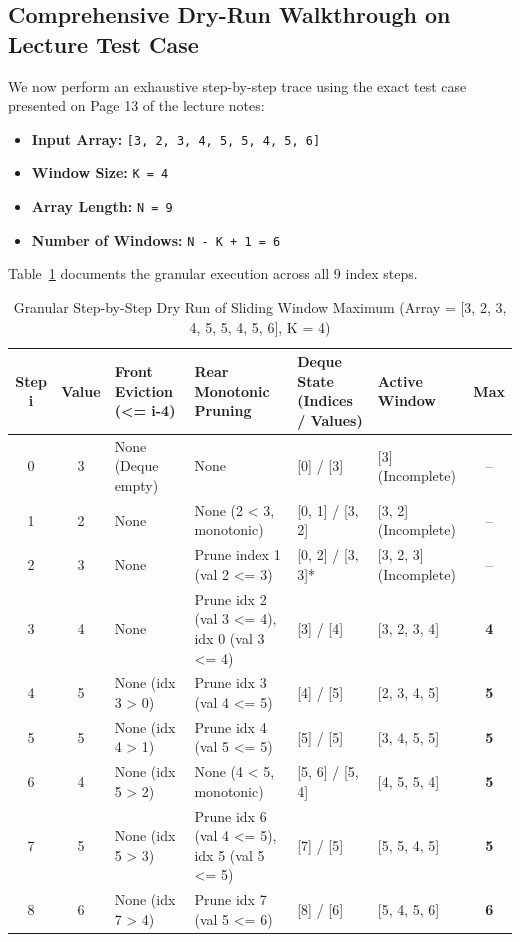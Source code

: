 \documentclass[10pt,journal,compsoc,onecolumn]{IEEEtran}
\begin{document}
\subsection{Comprehensive Dry-Run Walkthrough on Lecture Test Case}

We now perform an exhaustive step-by-step trace using the exact test case presented on Page 13 of the lecture notes:
\begin{itemize}
    \item \textbf{Input Array:} \texttt{[3, 2, 3, 4, 5, 5, 4, 5, 6]}
    \item \textbf{Window Size:} \texttt{K = 4}
    \item \textbf{Array Length:} \texttt{N = 9}
    \item \textbf{Number of Windows:} \texttt{N - K + 1 = 6}
\end{itemize}

Table~\ref{tab:sliding_window_trace} documents the granular execution across all 9 index steps.

\begin{table}[htbp]
\centering
\caption{Granular Step-by-Step Dry Run of Sliding Window Maximum (Array = [3, 2, 3, 4, 5, 5, 4, 5, 6], K = 4)}
\label{tab:sliding_window_trace}
\begin{tabular}{ccp{2.8cm}p{3.5cm}p{3.8cm}p{2.5cm}c}
\toprule
\textbf{Step i} & \textbf{Value} & \textbf{Front Eviction (<= i-4)} & \textbf{Rear Monotonic Pruning} & \textbf{Deque State (Indices / Values)} & \textbf{Active Window} & \textbf{Max} \\
\midrule
0 & 3 & None (Deque empty) & None & [0] / [3] & [3] (Incomplete) & -- \\
1 & 2 & None & None (2 < 3, monotonic) & [0, 1] / [3, 2] & [3, 2] (Incomplete) & -- \\
2 & 3 & None & Prune index 1 (val 2 <= 3) & [0, 2] / [3, 3]* & [3, 2, 3] (Incomplete) & -- \\
3 & 4 & None & Prune idx 2 (val 3 <= 4), idx 0 (val 3 <= 4) & [3] / [4] & [3, 2, 3, 4] & \textbf{4} \\
4 & 5 & None (idx 3 > 0) & Prune idx 3 (val 4 <= 5) & [4] / [5] & [2, 3, 4, 5] & \textbf{5} \\
5 & 5 & None (idx 4 > 1) & Prune idx 4 (val 5 <= 5) & [5] / [5] & [3, 4, 5, 5] & \textbf{5} \\
6 & 4 & None (idx 5 > 2) & None (4 < 5, monotonic) & [5, 6] / [5, 4] & [4, 5, 5, 4] & \textbf{5} \\
7 & 5 & None (idx 5 > 3) & Prune idx 6 (val 4 <= 5), idx 5 (val 5 <= 5) & [7] / [5] & [5, 5, 4, 5] & \textbf{5} \\
8 & 6 & None (idx 7 > 4) & Prune idx 7 (val 5 <= 6) & [8] / [6] & [5, 4, 5, 6] & \textbf{6} \\
\bottomrule
\end{tabular}
\end{table}
\end{document}
